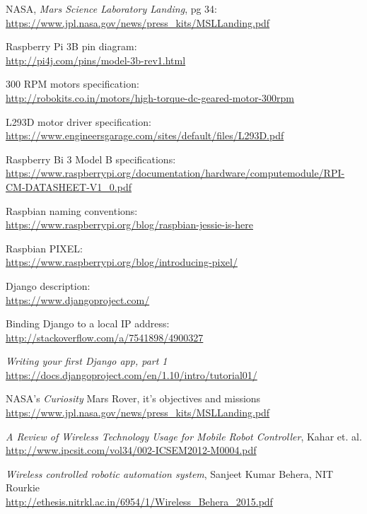 \documentclass[a4paper, 12pt, onecolumn]{article}
\begin{document}
\begin{thebibliography}{10}	%

	
	 NASA, \textit{Mars Science Laboratory Landing}, pg 34: \\
	\url{https://www.jpl.nasa.gov/news/press_kits/MSLLanding.pdf}
	
	
	 Raspberry Pi 3B pin diagram: \\
	\url{http://pi4j.com/pins/model-3b-rev1.html}

	
	 300 RPM motors specification: \\
	\url{http://robokits.co.in/motors/high-torque-dc-geared-motor-300rpm}
	
	 L293D motor driver specification: \\
	\url{https://www.engineersgarage.com/sites/default/files/L293D.pdf}
	

	 Raspberry Bi 3 Model B specifications: \\
	\url{https://www.raspberrypi.org/documentation/hardware/computemodule/RPI-CM-DATASHEET-V1_0.pdf}
		
	
	 Raspbian naming conventions: \\
	\url{https://www.raspberrypi.org/blog/raspbian-jessie-is-here}
	
	 Raspbian PIXEL: \\
	\url{https://www.raspberrypi.org/blog/introducing-pixel/}
	
	 Django description: \\
	\url{https://www.djangoproject.com/}
	
	 Binding Django to a local IP address: \\
	\url{http://stackoverflow.com/a/7541898/4900327}
	
	 \textit{Writing your first Django app, part 1} \\
	\url{https://docs.djangoproject.com/en/1.10/intro/tutorial01/}
	
	 NASA's \textit{Curiosity} Mars Rover, it's objectives and missions \\
	\url{https://www.jpl.nasa.gov/news/press_kits/MSLLanding.pdf}
	
		
	 \textit{A Review of Wireless Technology Usage for Mobile Robot Controller}, Kahar et. al. \\
	\url{http://www.ipcsit.com/vol34/002-ICSEM2012-M0004.pdf}
	
	 \textit{Wireless controlled robotic automation system}, Sanjeet Kumar Behera, NIT Rourkie \\
	\url{http://ethesis.nitrkl.ac.in/6954/1/Wireless_Behera_2015.pdf}
		
	
\end{thebibliography}
\end{document}
